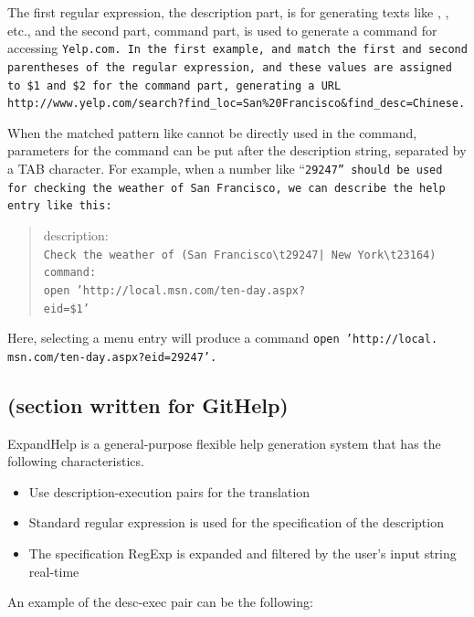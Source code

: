 \documentclass{sigchi}
\def\EH{\textsf{ExpandHelp}}
\begin{document}
The first regular expression, the description part,
is for generating texts like
, 
, etc.,
and the second part, command part,
is used to generate a command for accessing \tt{Yelp.com}.
In the first example,  and 
match the first and second parentheses of the regular expression, and
these values are assigned to \tt{\$1} and \tt{\$2}
for the command part, generating a URL
\tt{http://www.yelp.com/search?find\_loc=San\%20Francisco\&find\_desc=Chinese}.

When the matched pattern like 
cannot be directly used in the command,
parameters for the command can be put after the description string,
separated by a TAB character.
For example, when a number like ``\tt{29247}'' should be used
for checking the
weather of San Francisco, we can describe the help entry like this:

\begin{quote}\small
 description: \\
 \tt{Check the weather of (San Francisco{\textbackslash}t29247| New York{\textbackslash}t23164)} \\
 command: \\
 \tt{open 'http://local.msn.com/ten-day.aspx?\\eid=\$1'}
\end{quote}

Here, selecting a menu entry 
will produce a command
\tt{open 'http:{\slash}{\slash}local. msn.com{\slash}ten-day.aspx?eid=29247'}.

\subsection{(section written for GitHelp)}

{\EH} is a general-purpose flexible help generation system
that has the following characteristics.

\begin{itemize}
\item Use description-execution pairs for the translation
\item Standard regular expression is used for the specification of the description
\item The specification RegExp is expanded and filtered by the user's input string
  real-time
\end{itemize}

An example of the desc-exec pair can be the following:
\end{document}

